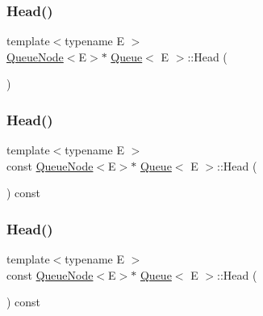 \mbox{\label{class_queue_a71aa0154ef75bb87a53b6af1829fcd5e}} 
\subsubsection{\texorpdfstring{Head()}{Head()}\hspace{0.1cm}{\footnotesize\ttfamily [4/6]}}
{\footnotesize\ttfamily template$<$typename E $>$ \\
\mbox{\hyperlink{class_queue_node}{Queue\+Node}}$<$E$>$$\ast$ \mbox{\hyperlink{class_queue}{Queue}}$<$ E $>$\+::Head (\begin{DoxyParamCaption}{ }\end{DoxyParamCaption})\hspace{0.3cm}{\ttfamily [inline]}}

\mbox{\label{class_queue_a6c906075e0ad2d1f0634990aa106395e}} 
\subsubsection{\texorpdfstring{Head()}{Head()}\hspace{0.1cm}{\footnotesize\ttfamily [5/6]}}
{\footnotesize\ttfamily template$<$typename E $>$ \\
const \mbox{\hyperlink{class_queue_node}{Queue\+Node}}$<$E$>$$\ast$ \mbox{\hyperlink{class_queue}{Queue}}$<$ E $>$\+::Head (\begin{DoxyParamCaption}{ }\end{DoxyParamCaption}) const\hspace{0.3cm}{\ttfamily [inline]}}

\mbox{\label{class_queue_a6c906075e0ad2d1f0634990aa106395e}} 
\subsubsection{\texorpdfstring{Head()}{Head()}\hspace{0.1cm}{\footnotesize\ttfamily [6/6]}}
{\footnotesize\ttfamily template$<$typename E $>$ \\
const \mbox{\hyperlink{class_queue_node}{Queue\+Node}}$<$E$>$$\ast$ \mbox{\hyperlink{class_queue}{Queue}}$<$ E $>$\+::Head (\begin{DoxyParamCaption}{ }\end{DoxyParamCaption}) const\hspace{0.3cm}{\ttfamily [inline]}}

